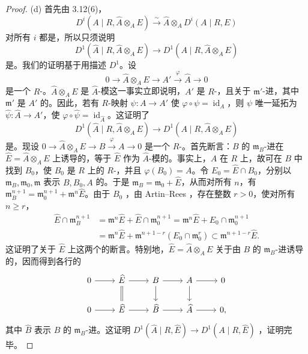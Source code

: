 \begin{proof}
(d) 首先由 3.12(6)，
\[D^i(A\mid R,\widehat A\otimes_A E)\xrightarrow{\sim}\widehat A\otimes_A D^i(A\mid R,E)\]
对所有 $i$ 都是，所以只须说明
\[D^1(\widehat A\mid R,\widehat A\otimes_A E)\longrightarrow D^1(A\mid R,\widehat A\otimes_A E)\]
是。我们的证明基于用描述 $D^1$。设
\[0\to\widehat A\otimes_A E\to A'\xrightarrow{\varphi}\widehat A\to0\]
是一个 $R$-。$\widehat A\otimes_A E$ 是 $\widehat A$-模这一事实立即说明，$A'$ 是 $R$-，且关于 $\mathfrak m'$-进，其中 $\mathfrak m'$ 是 $A'$ 的。因此，若有 $R$-映射 $\psi:A\to A'$ 使 $\varphi\circ\psi=\operatorname{id}_A$，则 $\psi$ 唯一延拓为 $\widehat\psi:\widehat A\to A'$，使 $\varphi\circ\widehat\psi=\operatorname{id}_{\widehat A}$。这证明了
\[D^1(\widehat A\mid R,\widehat A\otimes_A E)\longrightarrow D^1(A\mid R,\widehat A\otimes_A E)\]
是。现设 $0\to\widehat A\otimes_A E\to B\xrightarrow{\varphi}A\to0$ 是一个 $R$-。首先断言：$B$ 的 $\mathfrak m_B$-进在 $\widehat E=\widehat A\otimes_A E$ 上诱导的，等于 $\widehat E$ 作为 $\widehat A$-模的。事实上，$A$ 在 $R$ 上，故可在 $B$ 中找到 $B_0$，使 $B_0$ 是 $R$ 上的 $R$-，并且 $\varphi(B_0)=A$。令 $E_0=\widehat E\cap B_0$，分别以 $\mathfrak m_B,\mathfrak m_0,\mathfrak m$ 表示 $B,B_0,A$ 的。于是 $\mathfrak m_B=\mathfrak m_0+\widehat E$，从而对所有 $n$，有 $\mathfrak m_B^{n+1}=\mathfrak m_0^{n+1}+\mathfrak m^n\widehat E$。由于 $B_0$ ，由 Artin--Rees ，存在整数 $r>0$，使对所有 $n\geq r$，
\[
\begin{aligned}
\widehat E\cap\mathfrak m_B^{n+1}
&=\mathfrak m^n\widehat E+\widehat E\cap\mathfrak m_0^{n+1}
=\mathfrak m^n\widehat E+E_0\cap\mathfrak m_0^{n+1}\\
&=\mathfrak m^n\widehat E+\mathfrak m^{n+1-r}(E_0\cap\mathfrak m_0^r)
\subset\mathfrak m^{n+1-r}\widehat E.
\end{aligned}
\]
这证明了关于 $\widehat E$ 上这两个的断言。特别地，$\widehat E=\widehat A\otimes_A E$ 关于由 $B$ 的 $\mathfrak m_B$-进诱导的，因而得到各行的
\[
\begin{tikzcd}
0\arrow[r]&\widehat E\arrow[r]\arrow[d,equal]&B\arrow[r]\arrow[d]&A\arrow[r]\arrow[d]&0\\
0\arrow[r]&\widehat E\arrow[r]&\widehat B\arrow[r]&\widehat A\arrow[r]&0,
\end{tikzcd}
\]
其中 $\widehat B$ 表示 $B$ 的 $\mathfrak m_B$-进。这证明 $D^1(\widehat A\mid R,\widehat E)\to D^1(A\mid R,\widehat E)$ ，证明完毕。
\end{proof}

